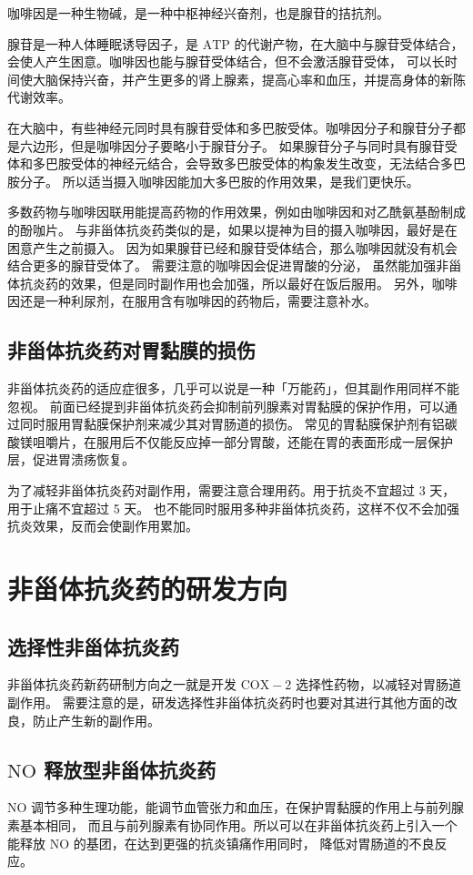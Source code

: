 \documentclass[12pt, a4paper, oneside]{ctexart}
\begin{document}
咖啡因是一种生物碱，是一种中枢神经兴奋剂，也是腺苷的拮抗剂。

腺苷是一种人体睡眠诱导因子，是 $\mathrm{ATP}$
的代谢产物，在大脑中与腺苷受体结合，会使人产生困意。咖啡因也能与腺苷受体结合，但不会激活腺苷受体，
可以长时间使大脑保持兴奋，并产生更多的肾上腺素，提高心率和血压，并提高身体的新陈代谢效率\cite{ref4}。

在大脑中，有些神经元同时具有腺苷受体和多巴胺受体。咖啡因分子和腺苷分子都是六边形，但是咖啡因分子要略小于腺苷分子。
如果腺苷分子与同时具有腺苷受体和多巴胺受体的神经元结合，会导致多巴胺受体的构象发生改变，无法结合多巴胺分子。
所以适当摄入咖啡因能加大多巴胺的作用效果，是我们更快乐。

多数药物与咖啡因联用能提高药物的作用效果，例如由咖啡因和对乙酰氨基酚制成的酚咖片。
与非甾体抗炎药类似的是，如果以提神为目的摄入咖啡因，最好是在困意产生之前摄入。
因为如果腺苷已经和腺苷受体结合，那么咖啡因就没有机会结合更多的腺苷受体了。
需要注意的咖啡因会促进胃酸的分泌，
虽然能加强非甾体抗炎药的效果，但是同时副作用也会加强，所以最好在饭后服用。
另外，咖啡因还是一种利尿剂，在服用含有咖啡因的药物后，需要注意补水。


\subsection{非甾体抗炎药对胃黏膜的损伤}
非甾体抗炎药的适应症很多，几乎可以说是一种「万能药」，但其副作用同样不能忽视。
前面已经提到非甾体抗炎药会抑制前列腺素对胃黏膜的保护作用，可以通过同时服用胃黏膜保护剂\cite{ref5}来减少其对胃肠道的损伤。
常见的胃黏膜保护剂有铝碳酸镁咀嚼片，在服用后不仅能反应掉一部分胃酸，还能在胃的表面形成一层保护层，促进胃溃疡恢复。

为了减轻非甾体抗炎药对副作用，需要注意合理用药。用于抗炎不宜超过 3 天，用于止痛不宜超过 5 天。
也不能同时服用多种非甾体抗炎药，这样不仅不会加强抗炎效果，反而会使副作用累加。

\newpage
\section{非甾体抗炎药的研发方向}
\subsection{选择性非甾体抗炎药}
非甾体抗炎药新药研制方向之一就是开发 $\mathrm{COX-2}$ 选择性药物，以减轻对胃肠道副作用。
需要注意的是，研发选择性非甾体抗炎药时也要对其进行其他方面的改良，防止产生新的副作用。

\subsection{$\mathrm{NO}$ 释放型非甾体抗炎药}
$\mathrm{NO}$ 调节多种生理功能\cite{ref6}，能调节血管张力和血压，在保护胃黏膜的作用上与前列腺素基本相同，
而且与前列腺素有协同作用。所以可以在非甾体抗炎药上引入一个能释放 $\mathrm{NO}$ 的基团，在达到更强的抗炎镇痛作用同时，
降低对胃肠道的不良反应。
\end{document}
